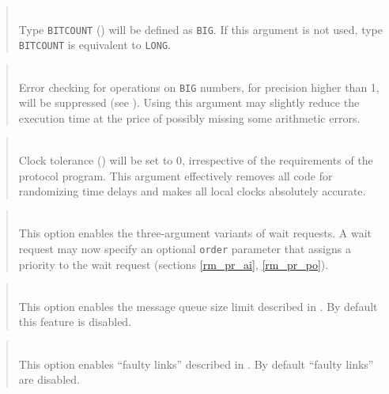 \begin{quote}
\noindent{}\\ \hspace{0in}
Type {\tt BITCOUNT} () will be defined as {\tt BIG}.
If this argument is not used, type {\tt BITCOUNT} is equivalent to {\tt LONG}.
\end{quote}

\begin{quote}
\noindent{}\\ \hspace{0in}
Error checking for operations on {\tt BIG} numbers, for
precision higher than 1, will be suppressed (see ).
Using this argument may slightly reduce the execution time at the price
of possibly missing some arithmetic errors.
\end{quote}

\begin{quote}
\noindent{}\\ \hspace{0in}
Clock tolerance ()
will be set to 0, irrespective of the requirements of the
protocol program.
This argument effectively removes all code for randomizing time delays and
makes all local clocks absolutely accurate.
\end{quote}

\begin{quote}
\noindent{}\\ \hspace{0in}
This option enables the three-argument variants of wait requests.
A wait request may now specify an optional {\tt order} parameter that
assigns a priority to the wait request (sections \ref{rm_pr_ai},
\ref{rm_pr_po}).
\end{quote}

\begin{quote}
\noindent{}\\ \hspace{0in}
This option enables the message queue size limit described in
.
By default this feature is disabled.
\end{quote}

\begin{quote}
\noindent{}\\ \hspace{0in}
This option enables ``faulty links'' described in .
By default ``faulty links'' are disabled.
\end{quote}

